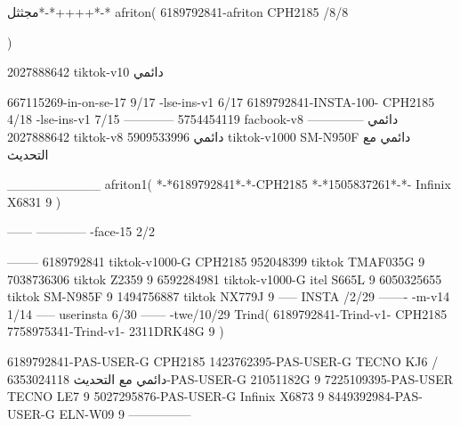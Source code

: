 مجثثل*-*++++*-*
afriton(
6189792841-afriton CPH2185  /8/8

)

2027888642 tiktok-v10
دائمي

667115269-in-on-se-17 9/17
-lse-ins-v1 6/17
6189792841-INSTA-100- CPH2185 4/18
-lse-ins-v1 7/15
------------
5754454119 facbook-v8
دائمي
--------------
2027888642 tiktok-v8
دائمي
5909533996 tiktok-v1000  SM-N950F
دائمي مع التحديث

__________
afriton1(
*-*6189792841*-*-CPH2185
*-*1505837261*-*-  Infinix X6831   9
)


------
------------
-face-15 2/2

--------
6189792841 tiktok-v1000-G CPH2185 
952048399 tiktok TMAF035G 9
7038736306 tiktok   Z2359  9
6592284981 tiktok-v1000-G  itel S665L  9
6050325655 tiktok  SM-N985F  9
1494756887 tiktok  NX779J  9
-----
 INSTA /2/29
-------
-m-v14 1/14
-----
userinsta 6/30
------
-twe/10/29
Trind(
6189792841-Trind-v1- CPH2185 
7758975341-Trind-v1- 2311DRK48G  9
)


6189792841-PAS-USER-G CPH2185 
1423762395-PAS-USER-G TECNO KJ6  /دائمي مع التحديث
6353024118-PAS-USER-G   21051182G  9
7225109395-PAS-USER   TECNO LE7  9
5027295876-PAS-USER-G   Infinix X6873   9
8449392984-PAS-USER-G   ELN-W09   9
    ---------------
